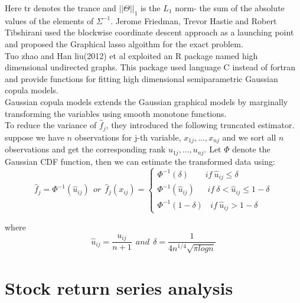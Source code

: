 \documentclass[12pt]{article}
\theoremstyle{plain}
\begin{document}
Here tr denotes the trance and $||\Theta||_1$ is the $L_1$ norm- the sum of the absolute values of the elements of $\Sigma^{-1}$. Jerome Friedman, Trevor Hastie and Robert Tibshirani used the blockwise coordinate descent approach as a launching point and proposed the Graphical lasso algoithm for the exact problem. \\
Tuo zhao and Han liu(2012) et al exploited an R package named high dimensional undirected graphs. This package used language C instead of fortran and provide functions for fitting high dimensional semiparametric Gaussian copula models.\\
Gaussian copula models extends the Gaussian graphical models by marginally transforming the variables using smooth monotone functions. \\To reduce the variance of $\hat{f}_j$, they introduced the following truncated estimator.\\
suppose we have $n$ observations for j-th variable, $x_{1j},...,x_{nj}$ and we sort all $n$ observations and get the corresponding rank $u_{1j},...,u_{nj}$. Let $\Phi$ denote the Gaussian CDF function, then we can estimate the transformed data using: \\
\begin{equation}
\hat{f}_j=\Phi^{-1}(\hat{u}_{ij})\ \
or\ \
\hat{f}_j(x_{ij})=
\begin{cases}
\Phi^{-1}(\delta)\ \ \ \ \ \ \ \ \  if \ \hat{u}_{ij}\leq\delta\\
\Phi^{-1}(\hat{u}_{ij})\ \ \ \ \ \ \  if \ \delta < \hat{u}_{ij}\leq{1-\delta}\\
\Phi^{-1}(1-\delta)\ \ \ \   if \ \hat{u}_{ij} > {1-\delta}
\end{cases}
\end{equation}

where \\

\begin{equation}
\hat{u}_{ij}=\frac{u_{ij}}{n+1}
\ \ and \ \
\delta =\frac{1}{4n^{1/4}\sqrt{\pi logn}}
\end{equation}

\section{Stock return series analysis}
\end{document}
